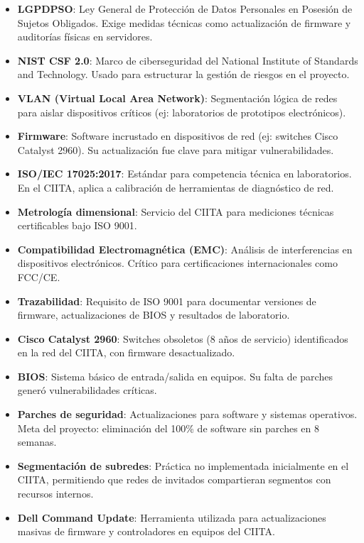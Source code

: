 \begin{itemize}
	
	\item \textbf{LGPDPSO}: Ley General de Protección de Datos Personales en Posesión de Sujetos Obligados. Exige medidas técnicas como actualización de firmware y auditorías físicas en servidores.
	
	\item \textbf{NIST CSF 2.0}: Marco de ciberseguridad del National Institute of Standards and Technology. Usado para estructurar la gestión de riesgos en el proyecto.
	
	\item \textbf{VLAN (Virtual Local Area Network)}: Segmentación lógica de redes para aislar dispositivos críticos (ej: laboratorios de prototipos electrónicos).
	
	\item \textbf{Firmware}: Software incrustado en dispositivos de red (ej: switches Cisco Catalyst 2960). Su actualización fue clave para mitigar vulnerabilidades.
	
	\item \textbf{ISO/IEC 17025:2017}: Estándar para competencia técnica en laboratorios. En el CIITA, aplica a calibración de herramientas de diagnóstico de red.
	
	\item \textbf{Metrología dimensional}: Servicio del CIITA para mediciones técnicas certificables bajo ISO 9001.
	
	\item \textbf{Compatibilidad Electromagnética (EMC)}: Análisis de interferencias en dispositivos electrónicos. Crítico para certificaciones internacionales como FCC/CE.
	
	\item \textbf{Trazabilidad}: Requisito de ISO 9001 para documentar versiones de firmware, actualizaciones de BIOS y resultados de laboratorio.
	
	\item \textbf{Cisco Catalyst 2960}: Switches obsoletos (8 años de servicio) identificados en la red del CIITA, con firmware desactualizado.
	
	\item \textbf{BIOS}: Sistema básico de entrada/salida en equipos. Su falta de parches generó vulnerabilidades críticas.
	
	\item \textbf{Parches de seguridad}: Actualizaciones para software y sistemas operativos. Meta del proyecto: eliminación del 100\% de software sin parches en 8 semanas.
	
	\item \textbf{Segmentación de subredes}: Práctica no implementada inicialmente en el CIITA, permitiendo que redes de invitados compartieran segmentos con recursos internos.
	
	\item \textbf{Dell Command Update}: Herramienta utilizada para actualizaciones masivas de firmware y controladores en equipos del CIITA.
\end{itemize}
